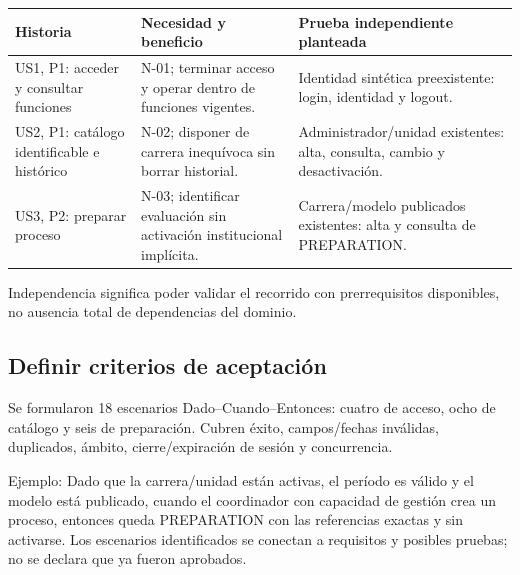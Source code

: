 \documentclass[11pt,a4paper]{article}
\begin{document}
{\def\LTcaptype{none} %
\begin{longtable}[]{@{}
  >{\raggedright\arraybackslash}p{}
  >{\raggedright\arraybackslash}p{}
  >{\raggedright\arraybackslash}p{}@{}}
\toprule\noalign{}
\begin{minipage}[b]{\linewidth}\raggedright
Historia
\end{minipage} & \begin{minipage}[b]{\linewidth}\raggedright
Necesidad y beneficio
\end{minipage} & \begin{minipage}[b]{\linewidth}\raggedright
Prueba independiente planteada
\end{minipage} \\
\midrule\noalign{}
\endhead
\bottomrule\noalign{}
\endlastfoot
US1, P1: acceder y consultar funciones & N-01; terminar acceso y operar
dentro de funciones vigentes. & Identidad sintética preexistente: login,
identidad y logout. \\
US2, P1: catálogo identificable e histórico & N-02; disponer de carrera
inequívoca sin borrar historial. & Administrador/unidad existentes:
alta, consulta, cambio y desactivación. \\
US3, P2: preparar proceso & N-03; identificar evaluación sin activación
institucional implícita. & Carrera/modelo publicados existentes: alta y
consulta de PREPARATION. \\
\end{longtable}
}

Independencia significa poder validar el recorrido con prerrequisitos
disponibles, no ausencia total de dependencias del dominio.

\subsection{Definir criterios de
aceptación}\label{definir-criterios-de-aceptaciuxf3n}

Se formularon 18 escenarios Dado--Cuando--Entonces: cuatro de acceso,
ocho de catálogo y seis de preparación. Cubren éxito, campos/fechas
inválidas, duplicados, ámbito, cierre/expiración de sesión y
concurrencia.

Ejemplo: Dado que la carrera/unidad están activas, el período es válido
y el modelo está publicado, cuando el coordinador con capacidad de
gestión crea un proceso, entonces queda PREPARATION con las referencias
exactas y sin activarse. Los escenarios identificados se conectan a
requisitos y posibles pruebas; no se declara que ya fueron aprobados.
\end{document}
